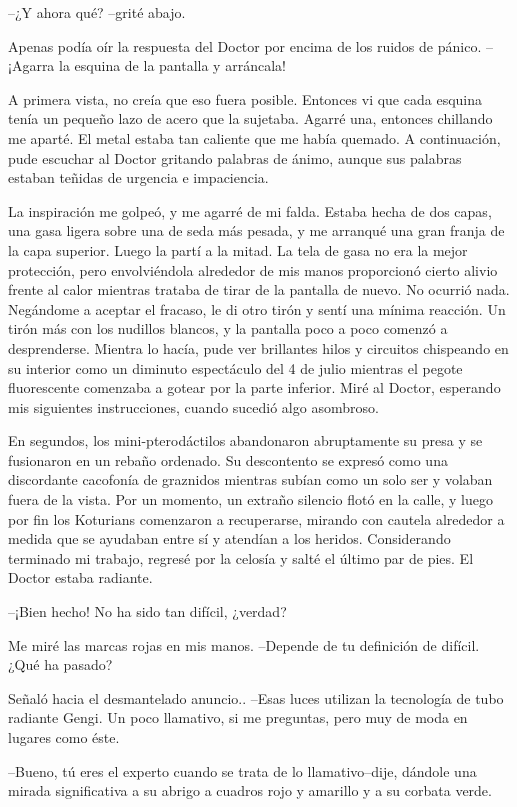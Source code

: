 --¿Y ahora qué? --grité abajo.

Apenas podía oír la respuesta del Doctor por encima de los ruidos de
pánico. --¡Agarra la esquina de la pantalla y arráncala!

A primera vista, no creía que eso fuera posible. Entonces vi que cada
esquina tenía un pequeño lazo de acero que la sujetaba. Agarré una,
entonces chillando me aparté. El metal estaba tan caliente que me había
quemado. A continuación, pude escuchar al Doctor gritando palabras de
ánimo, aunque sus palabras estaban teñidas de urgencia e impaciencia.

La inspiración me golpeó, y me agarré de mi falda. Estaba hecha de dos
capas, una gasa ligera sobre una de seda más pesada, y me arranqué una
gran franja de la capa superior. Luego la partí a la mitad. La tela de
gasa no era la mejor protección, pero envolviéndola alrededor de mis
manos proporcionó cierto alivio frente al calor mientras trataba de
tirar de la pantalla de nuevo. No ocurrió nada. Negándome a aceptar el
fracaso, le di otro tirón y sentí una mínima reacción. Un tirón más con
los nudillos blancos, y la pantalla poco a poco comenzó a desprenderse.
Mientra lo hacía, pude ver brillantes hilos y circuitos chispeando en su
interior como un diminuto espectáculo del 4 de julio mientras el pegote
fluorescente comenzaba a gotear por la parte inferior. Miré al Doctor,
esperando mis siguientes instrucciones, cuando sucedió algo asombroso.

En segundos, los mini-pterodáctilos abandonaron abruptamente su presa y
se fusionaron en un rebaño ordenado. Su descontento se expresó como una
discordante cacofonía de graznidos mientras subían como un solo ser y
volaban fuera de la vista. Por un momento, un extraño silencio flotó en
la calle, y luego por fin los Koturians comenzaron a recuperarse,
mirando con cautela alrededor a medida que se ayudaban entre sí y
atendían a los heridos. Considerando terminado mi trabajo, regresé por
la celosía y salté el último par de pies. El Doctor estaba radiante.

--¡Bien hecho! No ha sido tan difícil, ¿verdad?

Me miré las marcas rojas en mis manos. --Depende de tu definición de
difícil. ¿Qué ha pasado?

Señaló hacia el desmantelado anuncio.. --Esas luces utilizan la
tecnología de tubo radiante Gengi. Un poco llamativo, si me preguntas,
pero muy de moda en lugares como éste.

--Bueno, tú eres el experto cuando se trata de lo llamativo--dije,
dándole una mirada significativa a su abrigo a cuadros rojo y amarillo y
a su corbata verde.

